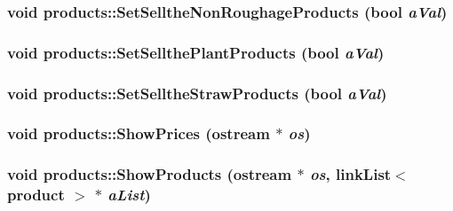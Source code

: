 \label{classproducts_aafdc02da42b92ae8cf0bb1a24664500d}
\hypertarget{classproducts_a6ff256b2b2b02cccbeffdcf3e10daf6b}{
\subsubsection[{SetSelltheNonRoughageProducts}]{\setlength{\rightskip}{0pt plus 5cm}void products::SetSelltheNonRoughageProducts (bool {\em aVal})}}
\label{classproducts_a6ff256b2b2b02cccbeffdcf3e10daf6b}
\hypertarget{classproducts_af814d0f34312e7f13be312349d2795aa}{
\subsubsection[{SetSellthePlantProducts}]{\setlength{\rightskip}{0pt plus 5cm}void products::SetSellthePlantProducts (bool {\em aVal})}}
\label{classproducts_af814d0f34312e7f13be312349d2795aa}
\hypertarget{classproducts_a4d9d3e19c3ab53930d506d69d10cf7bd}{
\subsubsection[{SetSelltheStrawProducts}]{\setlength{\rightskip}{0pt plus 5cm}void products::SetSelltheStrawProducts (bool {\em aVal})}}
\label{classproducts_a4d9d3e19c3ab53930d506d69d10cf7bd}
\hypertarget{classproducts_aada833a6042e21579d64f15edb742b01}{
\subsubsection[{ShowPrices}]{\setlength{\rightskip}{0pt plus 5cm}void products::ShowPrices (ostream $\ast$ {\em os})}}
\label{classproducts_aada833a6042e21579d64f15edb742b01}
\hypertarget{classproducts_a74c59dd845faf4570e5a4010722cfc95}{
\subsubsection[{ShowProducts}]{\setlength{\rightskip}{0pt plus 5cm}void products::ShowProducts (ostream $\ast$ {\em os}, \/  {\bf linkList}$<$ {\bf product} $>$ $\ast$ {\em aList})}}
